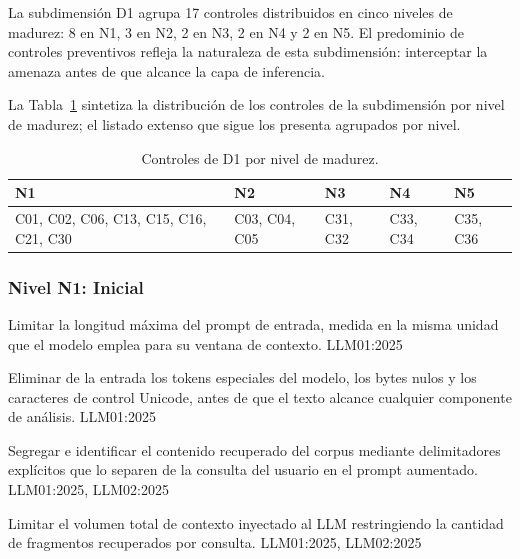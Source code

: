 La subdimensión D1 agrupa 17 controles distribuidos en cinco niveles de madurez: 8 en N1, 3 en N2, 2 en N3, 2 en N4 y 2 en N5. El predominio de controles preventivos refleja la naturaleza de esta subdimensión: interceptar la amenaza antes de que alcance la capa de inferencia.

La Tabla~\ref{tab:niveles-d1} sintetiza la distribución de los controles de la subdimensión por nivel de madurez; el listado extenso que sigue los presenta agrupados por nivel.

\begin{table}[H]
  \centering
  \caption{Controles de D1 por nivel de madurez.}
  \label{tab:niveles-d1}
  \begin{tabularx}{\textwidth}{@{} >{\raggedright\arraybackslash}X >{\raggedright\arraybackslash}X >{\raggedright\arraybackslash}X >{\raggedright\arraybackslash}X >{\raggedright\arraybackslash}X @{}}
    \toprule
    \cellcolor{level-n1!15}\textbf{N1} & \cellcolor{level-n2!15}\textbf{N2} & \cellcolor{level-n3!15}\textbf{N3} & \cellcolor{level-n4!15}\textbf{N4} & \cellcolor{level-n5!15}\textbf{N5} \\
    \midrule
    C01, C02, C06, C13, C15, C16, C21, C30 & C03, C04, C05 & C31, C32 & C33, C34 & C35, C36 \\
    \bottomrule
  \end{tabularx}
\end{table}

\subsubsection*{Nivel N1: Inicial}

  {Limitar la longitud máxima del prompt de entrada, medida en la misma unidad que el modelo emplea para su ventana de contexto.}
  {LLM01:2025}

  {Eliminar de la entrada los tokens especiales del modelo, los bytes nulos y los caracteres de control Unicode, antes de que el texto alcance cualquier componente de análisis.}
  {LLM01:2025}

  {Segregar e identificar el contenido recuperado del corpus mediante delimitadores explícitos que lo separen de la consulta del usuario en el prompt aumentado.}
  {LLM01:2025, LLM02:2025}

  {Limitar el volumen total de contexto inyectado al LLM restringiendo la cantidad de fragmentos recuperados por consulta.}
  {LLM01:2025, LLM02:2025}


